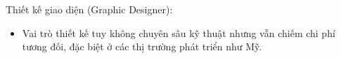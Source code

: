     \begin{flushleft}
      \hspace*{0.8cm}Thiết kế giao diện (Graphic Designer):
      \setlength{\leftmargini}{1.5cm}
      \begin{itemize}
          \item Vai trò thiết kế tuy không chuyên sâu kỹ thuật nhưng vẫn chiếm chi phí tương đối, đặc biệt ở các thị trường phát triển như Mỹ.
      \end{itemize}
    \end{flushleft}